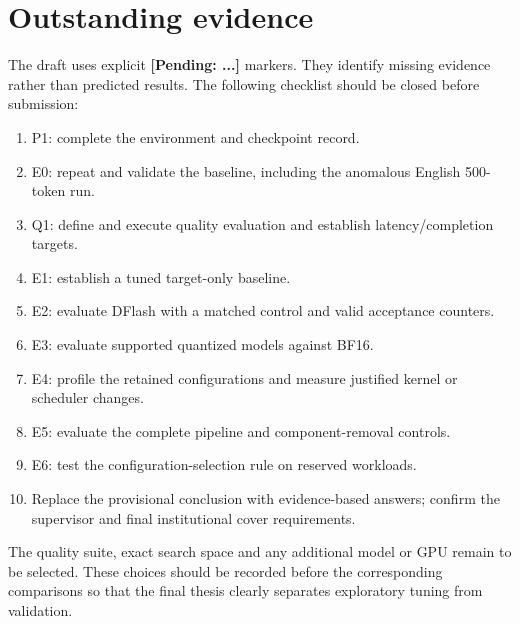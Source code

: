 \section{Outstanding evidence}
The draft uses explicit \textbf{[Pending: ...]} markers. They identify missing evidence rather than predicted results. The following checklist should be closed before submission:
\begin{enumerate}[noitemsep]
\item P1: complete the environment and checkpoint record.
\item E0: repeat and validate the baseline, including the anomalous English 500-token run.
\item Q1: define and execute quality evaluation and establish latency/completion targets.
\item E1: establish a tuned target-only baseline.
\item E2: evaluate DFlash with a matched control and valid acceptance counters.
\item E3: evaluate supported quantized models against BF16.
\item E4: profile the retained configurations and measure justified kernel or scheduler changes.
\item E5: evaluate the complete pipeline and component-removal controls.
\item E6: test the configuration-selection rule on reserved workloads.
\item Replace the provisional conclusion with evidence-based answers; confirm the supervisor and final institutional cover requirements.
\end{enumerate}

The quality suite, exact search space and any additional model or GPU remain to be selected. These choices should be recorded before the corresponding comparisons so that the final thesis clearly separates exploratory tuning from validation.
